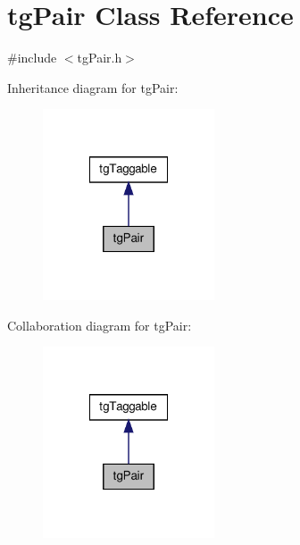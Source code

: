 \hypertarget{classtg_pair}{\section{tg\-Pair Class Reference}
\label{classtg_pair}
}


{\ttfamily \#include $<$tg\-Pair.\-h$>$}



Inheritance diagram for tg\-Pair\-:\nopagebreak
\begin{figure}[H]
\begin{center}
\leavevmode
\includegraphics[width=144pt]{classtg_pair__inherit__graph}
\end{center}
\end{figure}


Collaboration diagram for tg\-Pair\-:\nopagebreak
\begin{figure}[H]
\begin{center}
\leavevmode
\includegraphics[width=144pt]{classtg_pair__coll__graph}
\end{center}
\end{figure}
